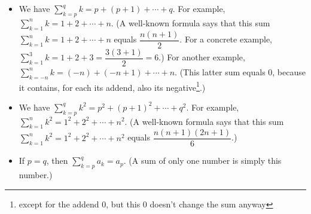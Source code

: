 \documentclass[numbers=enddot,12pt,final,onecolumn,notitlepage]{scrartcl}%
\theoremstyle{definition}
\let\sumnonlimits\sum
\renewcommand{\sum}{\sumnonlimits\limits}
\begin{document}
\begin{itemize}
\item We have $\sum_{k=p}^{q}k=p+\left(  p+1\right)  +\cdots+q$. For example,
$\sum_{k=1}^{n}k=1+2+\cdots+n$. (A well-known formula says that this sum
$\sum_{k=1}^{n}k=1+2+\cdots+n$ equals $\dfrac{n\left(  n+1\right)  }{2}$. For
a concrete example, $\sum_{k=1}^{3}k=1+2+3=\dfrac{3\left(  3+1\right)  }{2}%
=6$.) For another example, $\sum_{k=-n}^{n}k=\left(  -n\right)  +\left(
-n+1\right)  +\cdots+n$. (This latter sum equals $0$, because it contains, for
each its addend, also its negative\footnote{except for the addend $0$, but
this $0$ doesn't change the sum anyway}.)

\item We have $\sum_{k=p}^{q}k^{2}=p^{2}+\left(  p+1\right)  ^{2}+\cdots
+q^{2}$. For example, $\sum_{k=1}^{n}k^{2}=1^{2}+2^{2}+\cdots+n^{2}$. (A
well-known formula says that this sum $\sum_{k=1}^{n}k^{2}=1^{2}+2^{2}%
+\cdots+n^{2}$ equals $\dfrac{n\left(  n+1\right)  \left(  2n+1\right)  }{6}$.)

\item If $p=q$, then $\sum_{k=p}^{q}a_{k}=a_{p}$. (A sum of only one number is
simply this number.)
\end{itemize}
\end{document}
